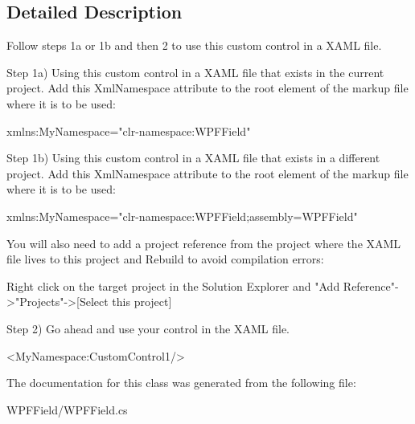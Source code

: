 \subsection{Detailed Description}
Follow steps 1a or 1b and then 2 to use this custom control in a X\-A\-M\-L file. 

Step 1a) Using this custom control in a X\-A\-M\-L file that exists in the current project. Add this Xml\-Namespace attribute to the root element of the markup file where it is to be used\-: \begin{DoxyVerb}xmlns:MyNamespace="clr-namespace:WPFField"
\end{DoxyVerb}


Step 1b) Using this custom control in a X\-A\-M\-L file that exists in a different project. Add this Xml\-Namespace attribute to the root element of the markup file where it is to be used\-: \begin{DoxyVerb}xmlns:MyNamespace="clr-namespace:WPFField;assembly=WPFField"
\end{DoxyVerb}


You will also need to add a project reference from the project where the X\-A\-M\-L file lives to this project and Rebuild to avoid compilation errors\-: \begin{DoxyVerb}Right click on the target project in the Solution Explorer and
"Add Reference"->"Projects"->[Select this project]
\end{DoxyVerb}


Step 2) Go ahead and use your control in the X\-A\-M\-L file. \begin{DoxyVerb}<MyNamespace:CustomControl1/>
\end{DoxyVerb}


The documentation for this class was generated from the following file\-:\begin{DoxyCompactItemize}
\item 
W\-P\-F\-Field/W\-P\-F\-Field.\-cs\end{DoxyCompactItemize}
